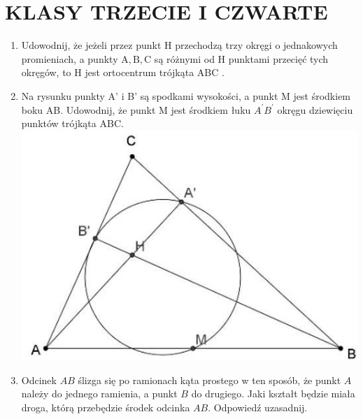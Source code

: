 \documentclass[10pt]{article}
\begin{document}
\section*{KLASY TRZECIE I CZWARTE}
\begin{enumerate}
  \item Udowodnij, że jeżeli przez punkt H przechodzą trzy okręgi o jednakowych promieniach, a punkty \(\mathrm{A}, \mathrm{B}, \mathrm{C}\) są różnymi od H punktami przecięć tych okręgów, to H jest ortocentrum trójkąta ABC .
  \item Na rysunku punkty A' i B' są spodkami wysokości, a punkt M jest środkiem boku AB. Udowodnij, że punkt M jest środkiem łuku \(A^{\prime} B^{\prime}\) okręgu dziewięciu punktów trójkąta ABC.\\
\includegraphics[max width=\textwidth, center]{2024_11_21_a2b9e49dabde1310792eg-1(2)}
  \item Odcinek \(A B\) ślizga się po ramionach kąta prostego w ten sposób, że punkt \(A\) należy do jednego ramienia, a punkt \(B\) do drugiego. Jaki kształt będzie miała droga, którą przebędzie środek odcinka \(A B\). Odpowiedź uzasadnij.\\

\end{enumerate}
\end{document}
